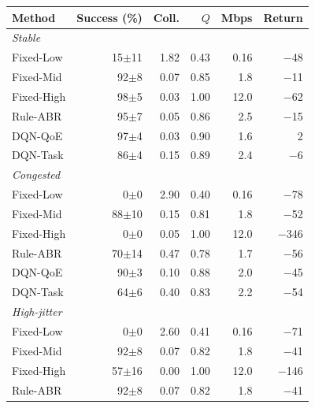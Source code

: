 \begin{tabular}{lrrrrr}
\hline
Method & Success (\%) & Coll. & $Q$ & Mbps & Return \\
\hline
\multicolumn{6}{l}{\textit{Stable}} \\
\hspace{1mm}Fixed-Low & 15$\pm$11 & 1.82 & 0.43 & 0.16 & $-$48 \\
\hspace{1mm}Fixed-Mid & 92$\pm$8 & 0.07 & 0.85 & 1.8 & $-$11 \\
\hspace{1mm}Fixed-High & 98$\pm$5 & 0.03 & 1.00 & 12.0 & $-$62 \\
\hspace{1mm}Rule-ABR & 95$\pm$7 & 0.05 & 0.86 & 2.5 & $-$15 \\
\hspace{1mm}DQN-QoE & 97$\pm$4 & 0.03 & 0.90 & 1.6 & 2 \\
\hspace{1mm}DQN-Task & 86$\pm$4 & 0.15 & 0.89 & 2.4 & $-$6 \\
\hline
\multicolumn{6}{l}{\textit{Congested}} \\
\hspace{1mm}Fixed-Low & 0$\pm$0 & 2.90 & 0.40 & 0.16 & $-$78 \\
\hspace{1mm}Fixed-Mid & 88$\pm$10 & 0.15 & 0.81 & 1.8 & $-$52 \\
\hspace{1mm}Fixed-High & 0$\pm$0 & 0.05 & 1.00 & 12.0 & $-$346 \\
\hspace{1mm}Rule-ABR & 70$\pm$14 & 0.47 & 0.78 & 1.7 & $-$56 \\
\hspace{1mm}DQN-QoE & 90$\pm$3 & 0.10 & 0.88 & 2.0 & $-$45 \\
\hspace{1mm}DQN-Task & 64$\pm$6 & 0.40 & 0.83 & 2.2 & $-$54 \\
\hline
\multicolumn{6}{l}{\textit{High-jitter}} \\
\hspace{1mm}Fixed-Low & 0$\pm$0 & 2.60 & 0.41 & 0.16 & $-$71 \\
\hspace{1mm}Fixed-Mid & 92$\pm$8 & 0.07 & 0.82 & 1.8 & $-$41 \\
\hspace{1mm}Fixed-High & 57$\pm$16 & 0.00 & 1.00 & 12.0 & $-$146 \\
\hspace{1mm}Rule-ABR & 92$\pm$8 & 0.07 & 0.82 & 1.8 & $-$41 \\

\end{tabular}
